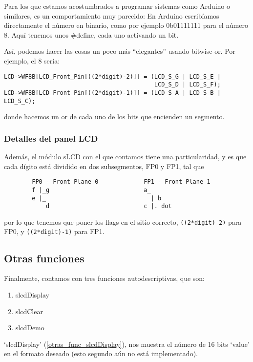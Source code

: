 \documentclass[a4paper,openright,12pt]{article}
\begin{document}
Para los que estamos acostumbrados a programar sistemas como Arduino o similares, es un comportamiento muy parecido: En Arduino escribíamos directamente el número en binario,
como por ejemplo 0b01111111 para el número 8. Aquí tenemos unos \#define, cada uno activando un bit.

Así, podemos hacer las cosas un poco más ``elegantes'' usando bitwise-or. Por ejemplo, el 8 sería:

\begin{verbatim}
LCD->WF8B[LCD_Front_Pin[((2*digit)-2)]] = (LCD_S_G | LCD_S_E |
                                           LCD_S_D | LCD_S_F);
LCD->WF8B[LCD_Front_Pin[((2*digit)-1)]] = (LCD_S_A | LCD_S_B | LCD_S_C);
\end{verbatim}
donde hacemos un or de cada uno de los bits que encienden un segmento.

\subsubsection{Detalles del panel LCD}
Además, el módulo sLCD con el que contamos tiene una particularidad, y es que cada dígito está dividido en dos subsegmentos, FP0 y FP1, tal que

\begin{samepage}
\begin{verbatim}
        FP0 - Front Plane 0             FP1 - Front Plane 1
        f |_g                           a_
        e |_                              | b
            d                           c |. dot
\end{verbatim}
\end{samepage}
por lo que tenemos que poner los flags en el sitio correcto, \texttt{((2*digit)-2)} para FP0, y \texttt{((2*digit)-1)} para FP1.

\subsection{Otras funciones}
Finalmente, contamos con tres funciones autodescriptivas, que son:
\begin{enumerate}[a]
    \item slcdDisplay   \label{otras_func_slcdDisplay}
    \item slcdClear     \label{otras_func_slcdClear}
    \item slcdDemo      \label{otras_func_slcdDemo}
\end{enumerate}


`slcdDisplay' (\ref{otras_func_slcdDisplay}), nos muestra el número de 16 bits `value' en el formato deseado (esto segundo aún no está implementado).
\end{document}
